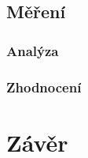\subsection{Měření}
\subsubsection{Analýza}
\subsubsection{Zhodnocení}


\section{Závěr}








\clearpage


